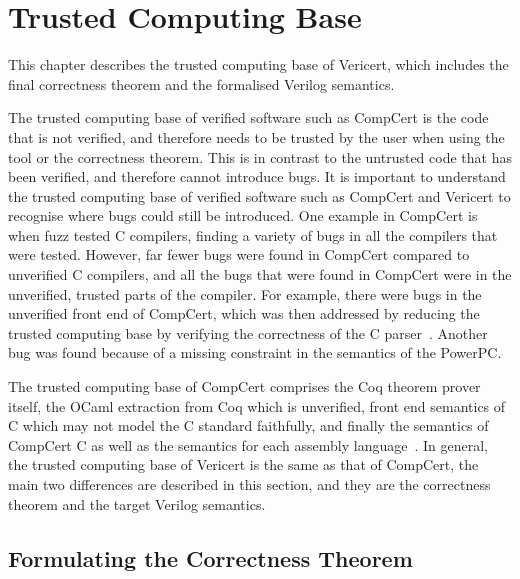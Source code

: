 \chapter{Trusted Computing Base}%
\label{sec:trusted-computing-base}

\begin{chapsummary}
  This chapter describes the trusted computing base of Vericert, which includes
  the final correctness theorem and the formalised Verilog semantics.
\end{chapsummary}

\noindent The trusted computing base of verified software such as CompCert is
the code that is not verified, and therefore needs to be trusted by the user
when using the tool or the correctness theorem.  This is in contrast to the
untrusted code that has been verified, and therefore cannot introduce bugs.  It
is important to understand the trusted computing base of verified software such
as CompCert and Vericert to recognise where bugs could still be introduced.  One
example in CompCert is when \textcite{yang11_findin_under_bugs_c_compil} fuzz
tested C compilers, finding a variety of bugs in all the compilers that were
tested.  However, far fewer bugs were found in CompCert compared to unverified C
compilers, and all the bugs that were found in CompCert were in the unverified,
trusted parts of the compiler.  For example, there were bugs in the unverified
front end of CompCert, which was then addressed by reducing the trusted
computing base by verifying the correctness of the C
parser~\cite{jourdan12_valid_lr_parser}.  Another bug was found because of a
missing constraint in the semantics of the PowerPC.

The trusted computing base of CompCert comprises the Coq theorem prover itself,
the OCaml extraction from Coq which is unverified, front end semantics of C
which may not model the C standard faithfully, and finally the semantics of
CompCert C as well as the semantics for each assembly
language~\cite{monniaux22_tcbcvc}.  In general, the trusted computing base of
Vericert is the same as that of CompCert, the main two differences are described
in this section, and they are the correctness theorem and the target Verilog
semantics.

\section{Formulating the Correctness Theorem}

